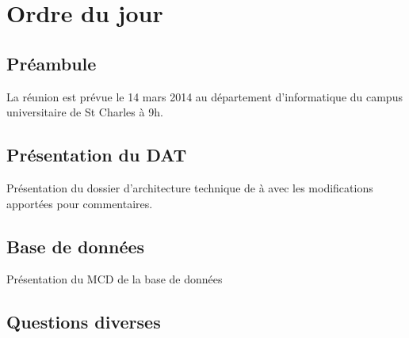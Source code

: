 \documentclass[11pt,fleqn]{report}
\begin{document}
\ZMakeCover


\chapter*{Ordre du jour}
\setcounter{chapter}{1}

\section{Préambule}
La réunion est prévue le 14 mars 2014 au département d'informatique du campus universitaire de St Charles à 9h.

\section{Présentation du DAT}
Présentation du dossier d'architecture technique de \amo à \mo avec les modifications apportées pour commentaires.

\section{Base de données}

Présentation du MCD de la base de données


\section{Questions diverses}
\end{document}
